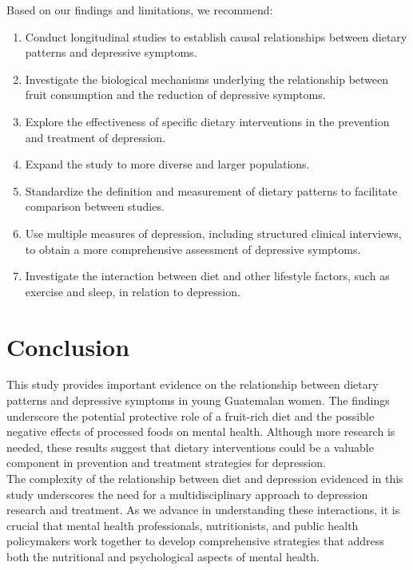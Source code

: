 \documentclass[jou]{apa7}
\begin{document}
Based on our findings and limitations, we recommend:
\begin{enumerate}
	\item Conduct longitudinal studies to establish causal relationships between dietary patterns and depressive symptoms.
	\item Investigate the biological mechanisms underlying the relationship between fruit consumption and the reduction of depressive symptoms.
	\item Explore the effectiveness of specific dietary interventions in the prevention and treatment of depression.
	\item Expand the study to more diverse and larger populations.
	\item Standardize the definition and measurement of dietary patterns to facilitate comparison between studies.
	\item Use multiple measures of depression, including structured clinical interviews, to obtain a more comprehensive assessment of depressive symptoms.
	\item Investigate the interaction between diet and other lifestyle factors, such as exercise and sleep, in relation to depression.
\end{enumerate}

\section{Conclusion}\label{conclusiuxf3n}

This study provides important evidence on the relationship between dietary patterns and depressive symptoms in young Guatemalan women. The findings underscore the potential protective role of a fruit-rich diet and the possible negative effects of processed foods on mental health. Although more research is needed, these results suggest that dietary interventions could be a valuable component in prevention and treatment strategies for depression.\\

The complexity of the relationship between diet and depression evidenced in this study underscores the need for a multidisciplinary approach to depression research and treatment. As we advance in understanding these interactions, it is crucial that mental health professionals, nutritionists, and public health policymakers work together to develop comprehensive strategies that address both the nutritional and psychological aspects of mental health.

\printbibliography
\end{document}
